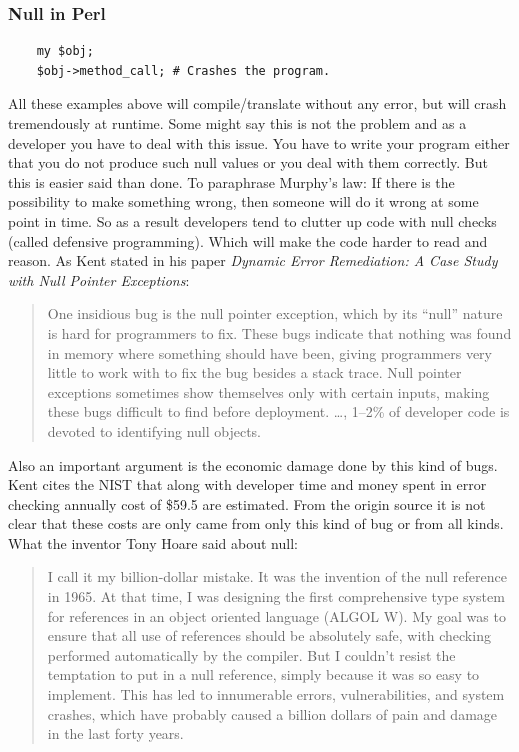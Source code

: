 \documentclass[12pt,a4paper]{report}
\begin{document}
\subsubsection{Null in Perl}
\begin{verbatim}
    my $obj;
    $obj->method_call; # Crashes the program.    
\end{verbatim}

All these examples above will compile/translate without any error, but will crash tremendously at runtime. Some might say this is not the problem and as a developer you have to deal with this issue. You have to write your program either that you do not produce such null values or you deal with them correctly. But this is easier said than done. To paraphrase Murphy's law\cite{murphys-law}: If there is the possibility to make something wrong, then someone will do it wrong at some point in time. So as a result developers tend to clutter up code with null checks (called defensive programming). Which will make the code harder to read and reason. As Kent\cite{kent-dyn-err-remediation} stated in his paper \textit{Dynamic Error Remediation: A Case Study with Null Pointer Exceptions}:

\begin{quotation}
    One insidious bug is the null pointer exception, which by its ``null'' nature is hard for programmers to fix. These bugs indicate that nothing was found in memory where something should have been, giving programmers very little to work with to fix the bug besides a stack trace. Null pointer exceptions sometimes show themselves only with certain inputs, making these bugs difficult to find before deployment. \ldots, 1--2\% of developer code is devoted to identifying null objects.
\end{quotation}

Also an important argument is the economic damage done by this kind of bugs. Kent\cite{kent-dyn-err-remediation} cites the NIST that along with developer time and money spent in error checking annually cost of \$59.5 are estimated. From the origin source it is not clear that these costs are only came from only this kind of bug or from all kinds. What the inventor Tony Hoare\cite{hoare-wiki} said about null\cite{hoeare-null}:

\begin{quotation}
I call it my billion-dollar mistake. It was the invention of the null reference in 1965. At that time, I was designing the first comprehensive type system for references in an object oriented language (ALGOL W). My goal was to ensure that all use of references should be absolutely safe, with checking performed automatically by the compiler. But I couldn't resist the temptation to put in a null reference, simply because it was so easy to implement. This has led to innumerable errors, vulnerabilities, and system crashes, which have probably caused a billion dollars of pain and damage in the last forty years.	
\end{quotation} 
\end{document}
